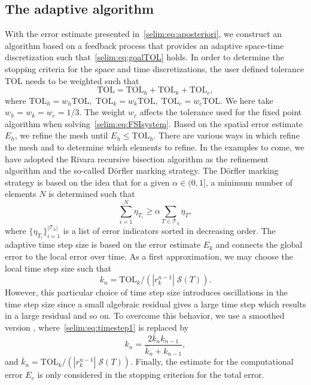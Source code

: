 \subsection{The adaptive algorithm}

With the \apost{} error estimate presented
in~\eqref{selim:eq:aposteriori}, we construct an algorithm based on a
feedback process that provides an adaptive space-time discretization
such that~\eqref{selim:eq:goalTOL} holds. In order to determine the
stopping criteria for the space and time discretizations, the user
defined tolerance $\mathrm{TOL}$ needs to be weighted such that
\begin{equation}
\mathrm{TOL} = \mathrm{TOL}_h + \mathrm{TOL}_k + \mathrm{TOL}_c,
\end{equation}
where $\mathrm{TOL}_h = w_h \mathrm{TOL}, \;\mathrm{TOL}_k = w_k
\mathrm{TOL}, \;\mathrm{TOL}_c = w_c \mathrm{TOL}$.  We here take $w_h
= w_k = w_c = 1/3$. The weight $w_c$ affects the tolerance used for
the fixed point algorithm when
solving~\eqref{selim:eq:FSIsystem}. Based on the spatial error
estimate $E_h$, we refine the mesh until $E_h \leqslant \mathrm{TOL}_h$.
There are various ways in which refine the mesh and to determine which
elements to refine. In the examples to come, we have adopted the
Rivara recursive bisection algorithm as the refinement algorithm
and the so-called
D\"{o}rfler \citep{Dorfler1996} marking strategy. The D\"{o}rfler
marking strategy is based on the idea that for a given
$\alpha\in(0,1]$, a minimum number of elements $N$ is determined
such that
\begin{equation}
  \label{selim:eq:dorfler}
\sum_{i=1}^{N}\eta_{T_i} \geqslant  \alpha \sum_{T\in\mathcal{T}_h}\eta_T ,
\end{equation}
where $\{ \eta_{T_{i}}\}_{i = 1}^{|\mathcal{T}_h|}$ is a list of error
indicators sorted in decreasing order. The adaptive time step size is
based on the error estimate $E_k$ and connects the global error to the
local error over time. As a first approximation, we may choose the
local time step size such that
\begin{equation}
\label{selim:eq:timestep1}
k_n = \mathrm{TOL}_k /(| r_k^{n-1} |\; \mathcal{S}(T)).
\end{equation}
However, this particular choice of time step size introduces
oscillations in the time step size since a small algebraic residual
gives a large time step which results in a large residual and so
on. To overcome this behavior, we use a smoothed
version \citep{Logg2004}, where~\eqref{selim:eq:timestep1} is replaced
by
\begin{equation}
\label{selim:eq:timestep2}
k_n = \frac{2\bar{k}_n k_{n-1}}{\bar{k}_n + k_{n-1}},
\end{equation}
and $\bar{k}_n = \mathrm{TOL}_k/(| r_k^{n-1} |
\;\mathcal{S}(T))$. Finally, the estimate for the computational error
$E_c$ is only considered in the stopping criterion for the total
error.

